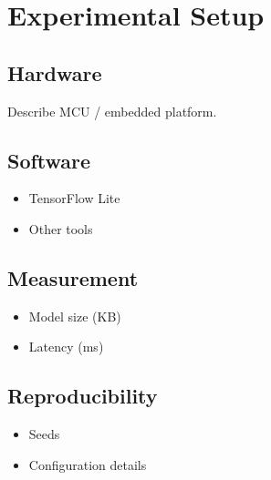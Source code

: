 \section{Experimental Setup}

\subsection{Hardware}
Describe MCU / embedded platform.

\subsection{Software}
\begin{itemize}
    \item TensorFlow Lite
    \item Other tools
\end{itemize}

\subsection{Measurement}
\begin{itemize}
    \item Model size (KB)
    \item Latency (ms)
\end{itemize}

\subsection{Reproducibility}
\begin{itemize}
    \item Seeds
    \item Configuration details
\end{itemize}